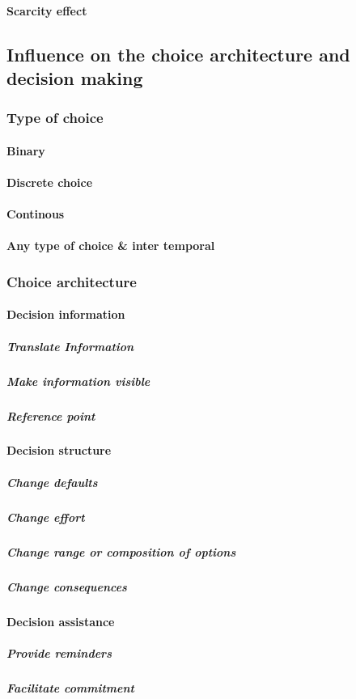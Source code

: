 \paragraph{Scarcity effect}


\subsection{Influence on the choice architecture and decision making}

\subsubsection{Type of choice}
\paragraph{Binary}
\paragraph{Discrete choice}
\paragraph{Continous}
\paragraph{Any type of choice \& inter temporal}

\subsubsection{Choice architecture}
\paragraph{Decision information}
\subparagraph{Translate Information}
\subparagraph{Make information visible}
\subparagraph{Reference point}
\paragraph{Decision structure}
\subparagraph{Change defaults}
\subparagraph{Change effort}
\subparagraph{Change range or composition of options}
\subparagraph{Change consequences}
\paragraph{Decision assistance}
\subparagraph{Provide reminders}
\subparagraph{Facilitate commitment}






